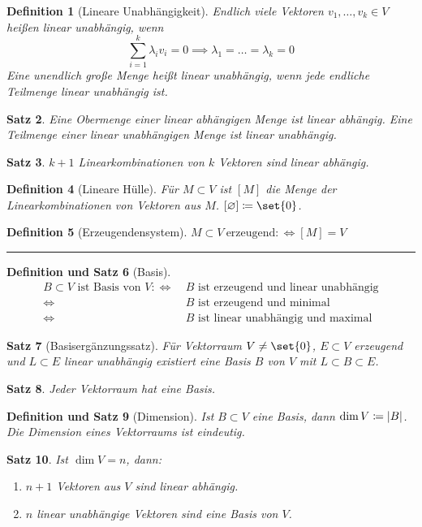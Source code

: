 \documentclass[a4paper]{article}
\newcounter{Sec}
\theoremstyle{marginbreak}
\newtheorem{definition}{Definition}[Sec]
\newtheorem{satz}[definition]{Satz}
\newtheorem{defsatz}[definition]{Definition und Satz}
\newcommand{\sep}{%
	\rule{\textwidth}{0.3pt}%
	\stepcounter{Sec}%
	}
\begin{document}
	\begin{definition}[Lineare Unabhängigkeit]
		Endlich viele Vektoren $v_1,\ldots,v_k \in V$ heißen linear unabhängig, wenn
		\[\sum_{i=1}^k\lambda_iv_i=0\implies\lambda_1=\ldots=\lambda_k=0\]
		Eine unendlich große Menge heißt linear unabhängig, wenn jede endliche Teilmenge
		linear unabhängig ist.
	\end{definition}
	\begin{satz}
		Eine Obermenge einer linear abhängigen Menge ist linear abhängig.
		Eine Teilmenge einer linear unabhängigen Menge ist linear unabhängig.
	\end{satz}
	\begin{satz}
		$k + 1$ Linearkombinationen von $k$ Vektoren sind linear abhängig.
	\end{satz}
	\begin{definition}[Lineare Hülle]
		Für $M \subset V$ ist $[M]$ die Menge der Linearkombinationen von Vektoren aus $M$.
		$[\varnothing] \coloneqq \set{0}$.
	\end{definition}
	\begin{definition}[Erzeugendensystem]
		$M \subset V~\text{erzeugend} :\Longleftrightarrow [M] = V$
	\end{definition}
	\sep
	\begin{defsatz}[Basis]%
		\begin{align*}%
			\text{$B \subset V$ ist Basis von $V$} :\Longleftrightarrow &~\text{$B$ ist erzeugend und linear unabhängig}\\
			\Longleftrightarrow &~\text{$B$ ist erzeugend und minimal}\\
			\Longleftrightarrow &~\text{$B$ ist linear unabhängig und maximal}
		\end{align*}
	\end{defsatz}
	\begin{satz}[Basisergänzungssatz]
		Für Vektorraum $V \neq \set{0}$, $E \subset V$ erzeugend und $L \subset E$ linear unabhängig
		existiert eine Basis $B$ von $V$ mit $L \subset B \subset E$.
	\end{satz}
	\begin{satz}
		Jeder Vektorraum hat eine Basis.
	\end{satz}
	\begin{defsatz}[Dimension]
		Ist $B \subset V$ eine Basis, dann $\dim V \coloneqq \abs{B}$. Die Dimension eines Vektorraums ist eindeutig.
	\end{defsatz}
	\begin{satz}
		Ist $\dim V = n$, dann:
		\begin{enumerate}[label=(\alph*)]
			\item $n + 1$ Vektoren aus $V$ sind linear abhängig.
			\item $n$ linear unabhängige Vektoren sind eine Basis von $V$.
		\end{enumerate}
	\end{satz}
\end{document}
